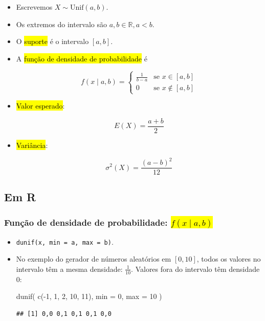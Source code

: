 \documentclass[
  11pt]{report}
\newenvironment{Shaded}{\begin{snugshade}}{\end{snugshade}}
\newcommand{\AttributeTok}[1]{\textcolor[rgb]{0.77,0.63,0.00}{#1}}
\newcommand{\DecValTok}[1]{\textcolor[rgb]{0.00,0.00,0.81}{#1}}
\newcommand{\FunctionTok}[1]{\textcolor[rgb]{0.00,0.00,0.00}{#1}}
\newcommand{\NormalTok}[1]{#1}
\newcommand{\SpecialCharTok}[1]{\textcolor[rgb]{0.00,0.00,0.00}{#1}}
\renewenvironment{Shaded}{
    \begin{mdframed}[%
      roundcorner=2pt,%
      innerleftmargin=5pt,%
      innerrightmargin=5pt,%
      topline=true,%
      leftline=true,%
      rightline=true,%
      bottomline=true,%
      linewidth=0.5pt,%
      linecolor=black!20,%
      backgroundcolor=black!2,%
      skipabove=2ex,%
      skipbelow=2.5ex%
    ]%
  }
  {
    \end{mdframed}
  }
\begin{document}
\begin{itemize}
\item
  Escrevemos $X \sim \text{Unif} (a, b)$.
\item
  Os extremos do intervalo são $a, b \in \mathbb{R}, a < b$.
\item
  O {\hl{suporte}} é o intervalo $[a, b]$.
\item
  A {\hl{função de densidade de probabilidade}} é

  \[
    f(x \mid a, b) = 
      \begin{cases}
        \frac{1}{b - a} & \text{se } x \in [a, b] \\
        0 & \text{se } x \not\in [a, b]
      \end{cases}
  \]
\item
  {\hl{Valor esperado}}:

  \[E(X) = \frac{a+b}{2}\]
\item
  {\hl{Variância}}:

  \[\sigma^2(X) = \frac{(a - b)^2}{12}\]
\end{itemize}

\hypertarget{em-r-5}{%
\subsection{Em R}\label{em-r-5}}

\hypertarget{funuxe7uxe3o-de-densidade-de-probabilidade-fx-mid-a-b}{%
\subsubsection*{\texorpdfstring{Função de densidade de probabilidade: {\hl{$f(x \mid a, b)$}}}{Função de densidade de probabilidade: }}\label{funuxe7uxe3o-de-densidade-de-probabilidade-fx-mid-a-b}}

\begin{itemize}
\item
  \texttt{dunif(x,\ min\ =\ a,\ max\ =\ b)}.
\item
  No exemplo do gerador de números aleatórios em $[0, 10]$, todos os valores no intervalo têm a mesma densidade: $\frac{1}{10}$. Valores fora do intervalo têm densidade $0$:

\begin{Shaded}
\begin{Highlighting}[]
\FunctionTok{dunif}\NormalTok{(}
  \FunctionTok{c}\NormalTok{(}\SpecialCharTok{{-}}\DecValTok{1}\NormalTok{, }\DecValTok{1}\NormalTok{, }\DecValTok{2}\NormalTok{, }\DecValTok{10}\NormalTok{, }\DecValTok{11}\NormalTok{), }
  \AttributeTok{min =} \DecValTok{0}\NormalTok{,}
  \AttributeTok{max =} \DecValTok{10}
\NormalTok{)}
\end{Highlighting}
\end{Shaded}

\begin{verbatim}
## [1] 0,0 0,1 0,1 0,1 0,0
\end{verbatim}
\end{itemize}
\end{document}
